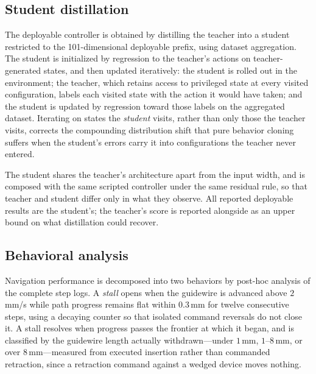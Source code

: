 \subsection{Student distillation}
\label{sec:student}


The deployable controller is obtained by distilling the teacher into a student restricted to the
101-dimensional deployable prefix, using dataset aggregation. The student is initialized by
regression to the teacher's actions on teacher-generated states, and then updated iteratively:
the student is rolled out in the environment; the teacher, which retains access to privileged
state at every visited configuration, labels each visited state with the action it would have
taken; and the student is updated by regression toward those labels on the aggregated dataset.
Iterating on states the \emph{student} visits, rather than only those the teacher visits,
corrects the compounding distribution shift that pure behavior cloning suffers when the
student's errors carry it into configurations the teacher never entered.

The student shares the teacher's architecture apart from the input width, and is composed with
the same scripted controller under the same residual rule, so that teacher and student differ
only in what they observe. All reported deployable results are the student's; the teacher's
score is reported alongside as an upper bound on what distillation could recover.

\subsection{Behavioral analysis}
\label{sec:behavior}


Navigation performance is decomposed into two behaviors by post-hoc analysis of the complete
step logs. A \emph{stall} opens when the guidewire is advanced above $2$\,mm/s while path
progress remains flat within $0.3$\,mm for twelve consecutive steps, using a decaying counter so
that isolated command reversals do not close it. A stall resolves when progress passes the
frontier at which it began, and is classified by the guidewire length actually withdrawn---under
$1$\,mm, $1$--$8$\,mm, or over $8$\,mm---measured from executed insertion rather than commanded
retraction, since a retraction command against a wedged device moves nothing.

